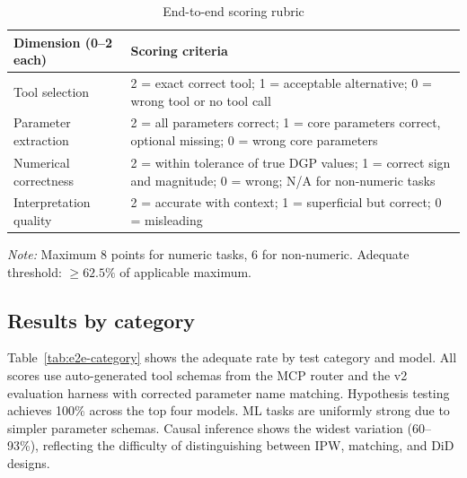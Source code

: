 \begin{table}[htbp]
\centering
\begin{threeparttable}
\caption{End-to-end scoring rubric}
\label{tab:e2e-rubric}
\small
\begin{tabular}{lp{9cm}}
\toprule
Dimension (0--2 each) & Scoring criteria \\
\midrule
Tool selection &
  2 = exact correct tool; 1 = acceptable alternative; 0 = wrong tool or no tool call \\
Parameter extraction &
  2 = all parameters correct; 1 = core parameters correct, optional missing;
  0 = wrong core parameters \\
Numerical correctness &
  2 = within tolerance of true DGP values; 1 = correct sign and magnitude;
  0 = wrong; N/A for non-numeric tasks \\
Interpretation quality &
  2 = accurate with context; 1 = superficial but correct; 0 = misleading \\
\bottomrule
\end{tabular}
\begin{tablenotes}[flushleft]
\item \emph{Note:} Maximum 8 points for numeric tasks, 6 for non-numeric.
Adequate threshold: $\geq 62.5\%$ of applicable maximum.
\end{tablenotes}
\end{threeparttable}
\end{table}

\subsection{Results by category}

Table~\ref{tab:e2e-category} shows the adequate rate by test category and
model.  All scores use auto-generated tool schemas from the MCP router
and the v2 evaluation harness with corrected parameter name matching.
Hypothesis testing achieves 100\% across the top four models.
ML tasks are uniformly strong due to simpler parameter schemas.
Causal inference shows the widest variation (60--93\%), reflecting
the difficulty of distinguishing between IPW, matching, and DiD designs.

